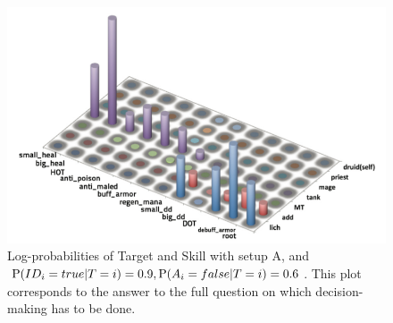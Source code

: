 \begin{figure}[h!]
\begin{center}
\includegraphics[width=12.5cm]{images/wow_distrib_target_skill.png}
\caption{Log-probabilities of Target and Skill with setup A, and $\mathrm{P}(ID_i=true|T=i)=0.9, \mathrm{P}(A_i=false|T=i)=0.6$. This plot corresponds to the answer to the full question on which decision-making has to be done.}
\label{fig:wow_target_skill}
\end{center}
\end{figure}

